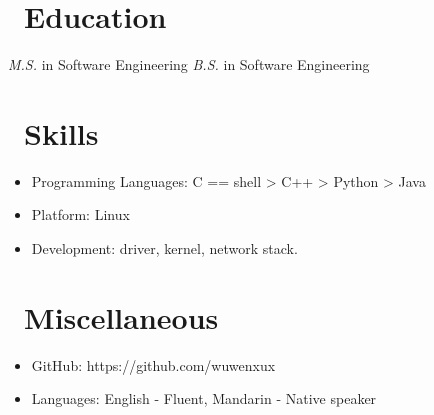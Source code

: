 \documentclass{resume}
\begin{document}
\section{\faGraduationCap\ Education}
\textit{M.S.} in Software Engineering 
\textit{B.S.} in Software Engineering 

\section{\faCogs\ Skills}
\begin{itemize}[parsep=0.5ex]
  \item Programming Languages: C == shell > C++  > Python > Java
  \item Platform: Linux
  \item Development: driver, kernel, network stack.
\end{itemize}

\section{\faInfo\ Miscellaneous}
\begin{itemize}[parsep=0.5ex]
  \item GitHub: https://github.com/wuwenxux
  \item Languages: English - Fluent, Mandarin - Native speaker
\end{itemize}

%
%
\end{document}

